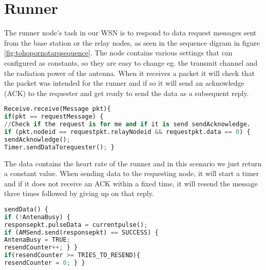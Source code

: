 \section{Runner}\label{sc:runner}

The runner node's task in our WSN is to respond to data request messages sent from the base station or the relay nodes, as seen in the sequence digram in figure \ref{fig:tohopornotarqsequence}. The node contains various settings that can configured as constants, so they are easy to change eg. the transmit channel and the radiation power of the antenna. When it receives a packet it will check that the packet was intended for the runner and if so it will send an acknowledge (ACK) to the requester and get ready to send the data as a subsequent reply.

\begin{lstlisting}[language=Python, label={lst:runner1}]
Receive.receive(Message pkt){
if(pkt == requestMessage) {
//Check if the request is for me and if it is send sendAcknowledge.
if (pkt.nodeid == requestpkt.relayNodeid && requestpkt.data == 0) {
sendAcknowledge();
Timer.sendDataTorequester(); }
\end{lstlisting}

The data contains the heart rate of the runner and in this scenario we just return a constant value. When sending data to the requesting node, it will start a timer and if it does not receive an ACK within a fixed time, it will resend the message three times followed by giving up on that reply.

\begin{lstlisting}[language=Python]
sendData() {
if (!AntenaBusy) {
responsepkt.pulseData = currentpulse();
if (AMSend.send(responsepkt) == SUCCESS) {
AntenaBusy = TRUE;
resendCounter++; } }		
if(resendCounter >= TRIES_TO_RESEND){
resendCounter = 0; } }
\end{lstlisting}

